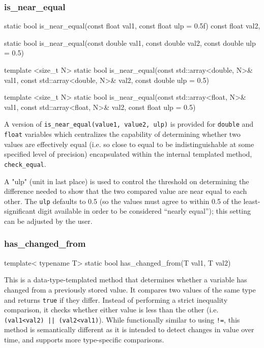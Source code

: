 \documentclass[11pt,fleqn]{report}
\begin{document}
\subsubsection{is\_near\_equal}
\begin{code}
static bool is_near_equal(const float val1,
                          const float ulp = 0.5f)
                          const float val2,

static bool is_near_equal(const double val1,
                          const double val2,
                          const double ulp = 0.5)

template <size_t N>
static bool is_near_equal(const std::array<double, N>& val1,
                          const std::array<double, N>& val2,
                          const double ulp = 0.5)

template <size_t N>
static bool is_near_equal(const std::array<float, N>& val1,
                          const std::array<float, N>& val2,
                          const float ulp = 0.5)
\end{code}

A version of \texttt{is\_near\_equal(value1, value2, ulp)}
is provided for \texttt{double} and \texttt{float} variables which centralizes
the capability of determining whether two values are effectively equal (i.e.
so close to equal to be indistinguishable at some specified level of
precision) encapsulated within the internal templated method, \texttt{check\_equal}.

A "ulp" (unit in last place) is used
to control the threshold on determining the difference needed to show that the
two compared value are near equal to each other. The \texttt{ulp} defaults to
0.5 (so the values must agree to within 0.5 of the least-significant digit
available in order to be considered ``nearly equal''); this setting can be
adjusted by the user.

\subsubsection{has\_changed\_from}
\begin{code}
template< typename T>
static bool has_changed_from(T val1, T val2)
\end{code}

This is a data-type-templated method that determines whether a variable has changed
from a previously stored value. It compares two values of the same type and returns
\texttt{true} if they differ. Instead of performing a strict inequality comparison,
it checks whether either value is less than the other (i.e. \texttt{(val1<val2) || (val2<val1)}). 
While functionally similar to using \texttt{!=}, this method is semantically different 
as it is intended to detect changes in value over time, and supports more type-specific
comparisons.
\end{document}
